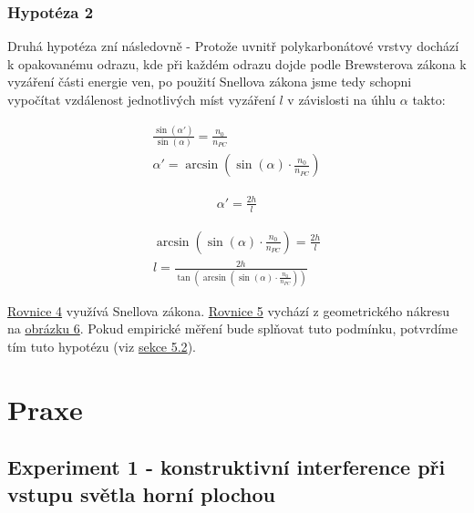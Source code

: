 \documentclass[titlepage]{article}
\begin{document}
\subsubsection{Hypotéza 2}
 \label{hyp:2}

Druhá hypotéza zní následovně - Protože uvnitř polykarbonátové vrstvy dochází k opakovanému odrazu, kde při každém odrazu dojde podle Brewsterova zákona k vyzáření části energie ven, po použití Snellova zákona jsme tedy schopni vypočítat vzdálenost jednotlivých míst vyzáření $l$ v závislosti na úhlu $\alpha$ takto:

\begin{equation}\label{eq4}
    \begin{gathered}
        \frac{\sin(\alpha')}{\sin(\alpha)} = \frac{n_0}{n_{PC}} \\
        \alpha' = \arcsin{\left(\sin(\alpha) \cdot \frac{n_0}{n_{PC}}\right)}
    \end{gathered}
\end{equation}

\begin{equation}\label{eq5}
    \begin{gathered}
        \alpha' = \frac{2h}{l}
    \end{gathered}
\end{equation}

\begin{equation}\label{eq6}
    \begin{gathered}
        \arcsin{\left(\sin(\alpha) \cdot \frac{n_0}{n_{PC}}\right)} = \frac{2h}{l} \\
        l = \frac{2h}{\tan{\left(\arcsin{\left(\sin(\alpha) \cdot \frac{n_0}{n_{PC}}\right)}\right)}}
    \end{gathered}
\end{equation}

\hyperref[eq4]{Rovnice 4} využívá Snellova zákona.
\hyperref[eq5]{Rovnice 5} vychází z geometrického nákresu na \hyperref[image:6]{obrázku 6}.
Pokud empirické měření bude splňovat tuto podmínku, potvrdíme tím tuto hypotézu (viz \hyperref[exp:2]{sekce 5.2}).

\section{Praxe}

\label{exp:1}
\subsection{Experiment 1 - konstruktivní interference při vstupu světla horní plochou}
\end{document}
